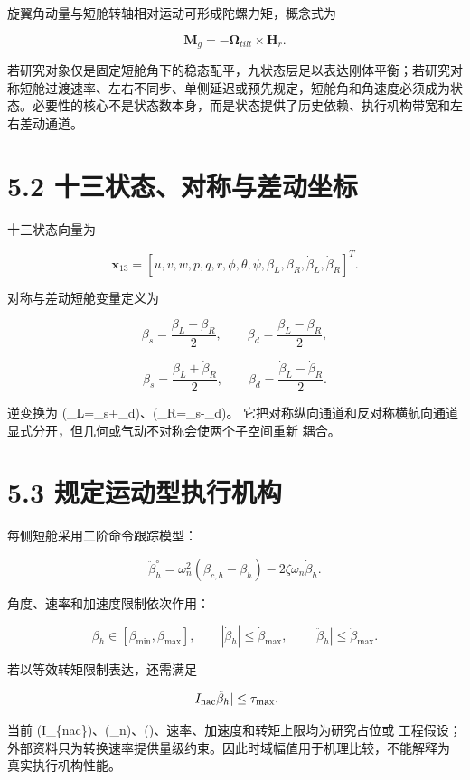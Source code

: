 \documentclass[UTF8,11pt,oneside,openany,fontset=windows]{ctexbook}
\begin{document}
旋翼角动量与短舱转轴相对运动可形成陀螺力矩，概念式为

\[\mathbf{M}_g=-\boldsymbol{\Omega}_{tilt}\times\mathbf{H}_r.\]

若研究对象仅是固定短舱角下的稳态配平，九状态层足以表达刚体平衡；若研究对称短舱过渡速率、左右不同步、单侧延迟或预先规定，短舱角和角速度必须成为状态。必要性的核心不是状态数本身，而是状态提供了历史依赖、执行机构带宽和左右差动通道。

\section{5.2
十三状态、对称与差动坐标}\label{ux5341ux4e09ux72b6ux6001ux5bf9ux79f0ux4e0eux5deeux52a8ux5750ux6807}

十三状态向量为

\[
\mathbf x_{13}=[u,v,w,p,q,r,\phi,\theta,\psi,\beta_L,\beta_R,
\dot\beta_L,\dot\beta_R]^T.
\]

对称与差动短舱变量定义为

\[
\beta_s=\frac{\beta_L+\beta_R}{2},\qquad
\beta_d=\frac{\beta_L-\beta_R}{2},
\]

\[
\dot\beta_s=\frac{\dot\beta_L+\dot\beta_R}{2},\qquad
\dot\beta_d=\frac{\dot\beta_L-\dot\beta_R}{2}.
\]

逆变换为 (\beta\_L=\beta\_s+\beta\_d)、(\beta\_R=\beta\_s-\beta\_d)。
它把对称纵向通道和反对称横航向通道显式分开，但几何或气动不对称会使两个子空间重新
耦合。

\section{5.3
规定运动型执行机构}\label{ux89c4ux5b9aux8fd0ux52a8ux578bux6267ux884cux673aux6784}

每侧短舱采用二阶命令跟踪模型：

\[
\ddot\beta_h^\circ=
\omega_n^2(\beta_{c,h}-\beta_h)-2\zeta\omega_n\dot\beta_h.
\]

角度、速率和加速度限制依次作用：

\[
\beta_h\in[\beta_{\min},\beta_{\max}],\qquad
|\dot\beta_h|\le\dot\beta_{\max},\qquad
|\ddot\beta_h|\le\ddot\beta_{\max}.
\]

若以等效转矩限制表达，还需满足

\[
|I_{\rm nac}\ddot\beta_h|\le\tau_{\max}.
\]

当前
(I\_\{\rm nac\})、(\omega\_n)、(\zeta)、速率、加速度和转矩上限均为研究占位或
工程假设；外部资料只为转换速率提供量级约束。因此时域幅值用于机理比较，不能解释为
真实执行机构性能。
\end{document}

